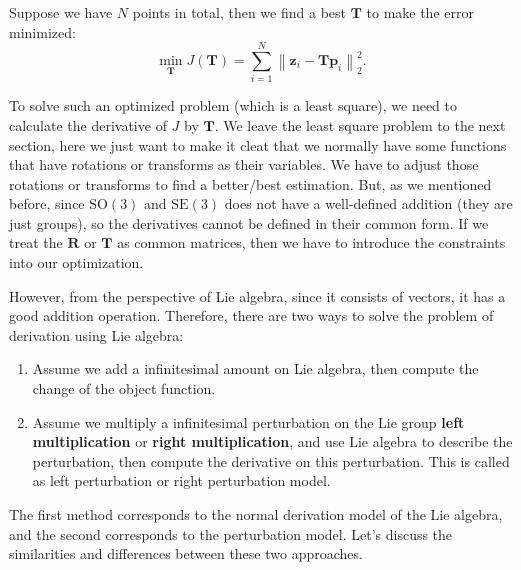 Suppose we have $N$ points in total, then we find a best $\mathbf{T}$ to make the error minimized: 
\begin{equation}
\mathop {\min }\limits_{\mathbf{T}} J(\mathbf{T} ) = \sum_{i=1}^{N} \left\| {\mathbf{z}_i - \mathbf{Tp}_i} \right\|^2_2.
\end{equation}

To solve such an optimized problem (which is a least square), we need to calculate the derivative of $J$ by $\mathbf{T}$. We leave the least square problem to the next section, here we just want to make it cleat that we normally have some functions that have rotations or transforms as their variables. We have to adjust those rotations or transforms to find a better/best estimation. But, as we mentioned before, since $\mathrm{SO}(3)$ and $\mathrm{SE}(3)$ does not have a well-defined addition (they are just groups), so the derivatives cannot be defined in their common form. If we treat the $\mathbf{R}$ or $\mathbf{T}$ as common matrices, then we have to introduce the constraints into our optimization. 

However, from the perspective of Lie algebra, since it consists of vectors, it has a good addition operation. Therefore, there are two ways to solve the problem of derivation using Lie algebra:

\begin{enumerate}
    \item Assume we add a infinitesimal amount on Lie algebra, then compute the change of the object function.
    \item Assume we multiply a infinitesimal perturbation on the Lie group \textbf{left multiplication} or \textbf{right multiplication}, and use Lie algebra to describe the perturbation, then compute the derivative on this perturbation. This is called as left perturbation or right perturbation model.
\end{enumerate}

The first method corresponds to the normal derivation model of the Lie algebra, and the second corresponds to the perturbation model. Let's discuss the similarities and differences between these two approaches.

